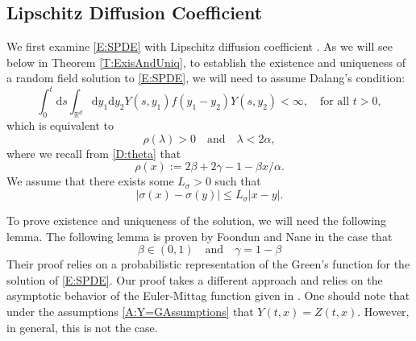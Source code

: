 \documentclass[a4paper,11pt]{article}
\numberwithin{equation}{section}
\theoremstyle{plain}
\theoremstyle{definition}
\newcommand{\ud}{\ensuremath{\mathrm{d} }}
\newcommand{\R}{\mathbb{R}}
\numberwithin{NQ}{section}
\numberwithin{LQ}{section}
\numberwithin{ZQ}{section}
\begin{document}
	\subsection{Lipschitz Diffusion Coefficient}
	We first examine \eqref{E:SPDE} with Lipschitz diffusion coefficient . As we will see below in Theorem \ref{T:ExisAndUniq}, to establish the existence and uniqueness of a random field solution to \eqref{E:SPDE}, we will need to assume Dalang's condition:
	\begin{equation}
	\label{C:DalangCl}
	\int_0^t \ud s \int_{\R^d} \ud y_1 \ud y_2 Y(s,y_1) f(y_1-y_2) Y(s,y_2 )< \infty, \quad \text{for all } t>0,
	\end{equation} 
	which is equivalent to
	\begin{equation}
	\label{E:DalangEquiv2Cl}
	\rho(\lambda) > 0 \quad \text{and} \quad \lambda < 2\alpha,
	\end{equation}
	where we recall from \eqref{D:theta} that
	\begin{equation}
	\rho(x) := 2\beta + 2\gamma -1 -\beta x / \alpha.
	\end{equation}
	We assume that there exists some $L_\sigma > 0$ such that 
	\[
	|\sigma(x) - \sigma(y)| \le L_{\sigma} |x-y|.
	\]
	
	To prove existence and uniqueness of the solution, we will need the following lemma. The following lemma is proven by Foondun and Nane \cite{FN2016} in the case that 		
	\begin{equation}
	\label{A:Y=GAssumptions}
	\beta \in (0,1) \quad \text{and} \quad \gamma = 1 - \beta
	\end{equation}		
	Their proof relies on a probabilistic representation of the Green's function for the solution of \eqref{E:SPDE}. Our proof takes a different approach and relies on the asymptotic behavior of the Euler-Mittag function given in \cite[Theorem 1.6]{Podlubny99}. One should note that under the assumptions \eqref{A:Y=GAssumptions} that $Y(t,x)=Z(t,x)$. However, in general, this is not the case. 
	
\end{document}
